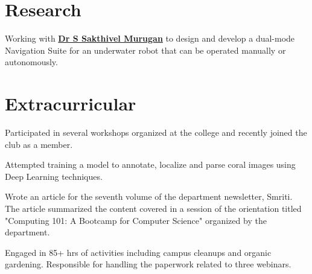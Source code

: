 \documentclass[]{deedy-resume-openfont}
\begin{document}
\begin{minipage}[t]{0.64\textwidth}

\section{Research}
Working with \textbf{\href{https://sites.google.com/view/uwarlssn}{Dr S Sakthivel Murugan}} to design and develop a dual-mode Navigation Suite for an underwater robot that can be operated manually or autonomously.  
\sectionsep



\section{Extracurricular}
Participated in several workshops organized at the college and recently joined the club as a member.
\sectionsep

Attempted training a model to annotate, localize and parse coral images using Deep Learning techniques. 
\sectionsep

 Wrote an article for the seventh volume of the department newsletter, Smriti.
 The article summarized the content covered in a session of the orientation titled "Computing 101: A Bootcamp for Computer Science" organized by the department.
\sectionsep

Engaged in 85+ hrs of activities including campus cleanups and organic gardening. Responsible for handling the paperwork related to three webinars.  
\sectionsep

\end{minipage} 
\end{document}
